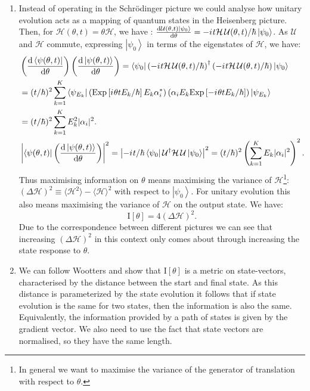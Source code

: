\documentclass[reqno]{amsart}
\newcommand{\ket}[1]{\left| #1 \right>}
\newcommand{\bra}[1]{\left< #1 \right|}
\newcommand{\hham}{\mathcal{H}}
\newcommand{\iu}{{i\mkern1mu}}
\def\func#1#2{\mathrm{#1}\left[#2\right]}
\begin{document}
\begin{enumerate}
\item Instead of operating in the Schr\"odinger picture we could analyse how unitary evolution acts as a mapping of quantum states in the Heisenberg picture. Then, for $\hham(\theta, t) = \theta \hham$, we have : $\frac{\mathrm{d} \mathcal{U}(\theta,t)\ket{\psi_0}}{\mathrm{d}\theta} = -\iu t \hham \, \mathcal{U}(\theta, t)/\hbar \ket{\psi_0}$. As $\mathcal{U}$ and $\hham$ commute, expressing $\ket{\psi_0}$ in terms of the eigenstates of $\hham$, we have:
\[
\begin{split}
& \left(\frac{\mathrm{d}\bra{\psi(\theta,t)}}{\mathrm{d} \theta}\right)\left(\frac{\mathrm{d}\ket{\psi(\theta,t)}}{\mathrm{d} \theta}\right) = \bra{\psi_0}\left(-\iu t \hham \, \mathcal{U}(\theta,t)/\hbar\right)^{\dagger}\left(-\iu t \hham \, \mathcal{U}(\theta,t)/\hbar\right)\ket{\psi_0} \\
& = (t/\hbar)^2 \sum_{k = 1}^K \bra{\psi_{E_k}} \left(\func{Exp}{\iu \theta t E_k/\hbar}E_k \alpha_i^{\ast}\right)\left(\alpha_i E_k\func{Exp}{-\iu \theta t E_k/\hbar}\right) \ket{\psi_{E_k}}\\
& = (t/\hbar)^2 \sum_{k = 1}^K  E_k^2 |\alpha_i|^2.\\
& \left|\bra{\psi(\theta,t)}\left(\frac{\mathrm{d}\ket{\psi(\theta,t)}}{\mathrm{d} \theta}\right)\right|^2 = \left|-\iu t/\hbar \bra{\psi_0}\mathcal{U}^{\dagger} \hham \,\mathcal{U}\ket{\psi_0}\right|^2 = (t/\hbar)^2\left(\sum_{k = 1}^K  E_k |\alpha_i|^2\right)^2.
\end{split}
\]
Thus maximising information on $\theta$ means maximising the variance of $\hham$\footnote{In general we want to maximise the variance of the generator of translation with respect to $\theta$.}: $(\Delta \hham)^2 \equiv \langle \hham^2 \rangle - \langle \hham \rangle^2$ with respect to $\ket{\psi_0}$. For unitary evolution this also means maximising the variance of $\hham$ on the output state. We have:
\[ \func{I}{\theta} = 4\left(\Delta \hham\right)^2.\]
Due to the correspondence between different pictures we can see that increasing $\left(\Delta \hham\right)^2$ in this context only comes about through increasing the state response to $\theta$.

\item We can follow Wootters \cite{Wootters1981} and show that $\func{I}{\theta}$ is a metric on state-vectors, characterised by the distance between the start and final state. As this distance is parameterized by the state evolution it follows that if state evolution is the same for two states, then the information is also the same. Equivalently, the information provided by a path of states is given by the gradient vector. We also need to use the fact that state vectors are normalised, so they have the same length.


\end{enumerate}
\end{document}
